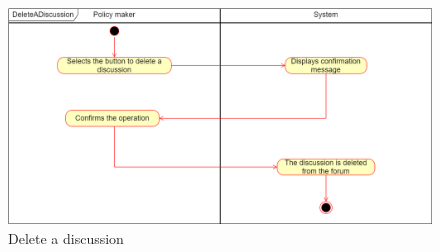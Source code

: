     \begin{figure}[h!]
        \centering
        \includegraphics[scale=0.38]{images/use_cases_diagram/policymaker_delete_discussion.png}
        \caption{Delete a discussion}
        \label{fig:policymaker_delete_discussion}
    \end{figure}
    \FloatBarrier
    \newpage
